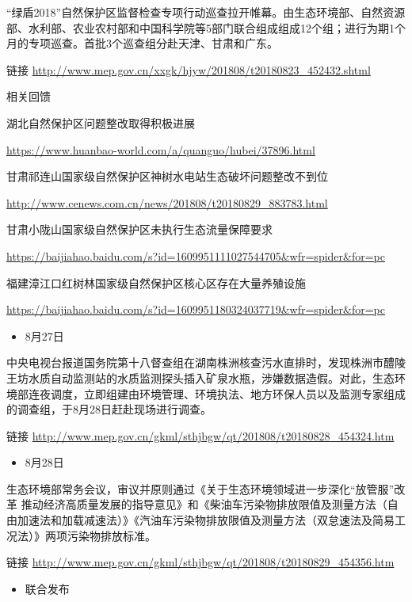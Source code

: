 \documentclass[]{book}
\providecommand{\tightlist}{%
  \setlength{\itemsep}{0pt}\setlength{\parskip}{0pt}}
\begin{document}
``绿盾2018''自然保护区监督检查专项行动巡查拉开帷幕。由生态环境部、自然资源部、水利部、农业农村部和中国科学院等5部门联合组成组成12个组；进行为期1个月的专项巡查。首批3个巡查组分赴天津、甘肃和广东。

链接 \url{http://www.mep.gov.cn/xxgk/hjyw/201808/t20180823_452432.shtml}

相关回馈

湖北自然保护区问题整改取得积极进展

\url{https://www.huanbao-world.com/a/quanguo/hubei/37896.html}

甘肃祁连山国家级自然保护区神树水电站生态破坏问题整改不到位

\url{http://www.cenews.com.cn/news/201808/t20180829_883783.html}

甘肃小陇山国家级自然保护区未执行生态流量保障要求

\url{https://baijiahao.baidu.com/s?id=1609951111027544705\&wfr=spider\&for=pc}

福建漳江口红树林国家级自然保护区核心区存在大量养殖设施

\url{https://baijiahao.baidu.com/s?id=1609951180324037719\&wfr=spider\&for=pc}

\begin{itemize}
\tightlist
\item
  8月27日
\end{itemize}

中央电视台报道国务院第十八督查组在湖南株洲核查污水直排时，发现株洲市醴陵王坊水质自动监测站的水质监测探头插入矿泉水瓶，涉嫌数据造假。对此，生态环境部连夜调度，立即组建由环境管理、环境执法、地方环保人员以及监测专家组成的调查组，于8月28日赶赴现场进行调查。

链接
\url{http://www.mep.gov.cn/gkml/sthjbgw/qt/201808/t20180828_454324.htm}

\begin{itemize}
\tightlist
\item
  8月28日
\end{itemize}

生态环境部常务会议，审议并原则通过《关于生态环境领域进一步深化``放管服''改革
推动经济高质量发展的指导意见》和《柴油车污染物排放限值及测量方法（自由加速法和加载减速法）》《汽油车污染物排放限值及测量方法（双怠速法及简易工况法）》两项污染物排放标准。

链接
\url{http://www.mep.gov.cn/gkml/sthjbgw/qt/201808/t20180829_454356.htm}

\begin{itemize}
\tightlist
\item
  联合发布
\end{itemize}
\end{document}
